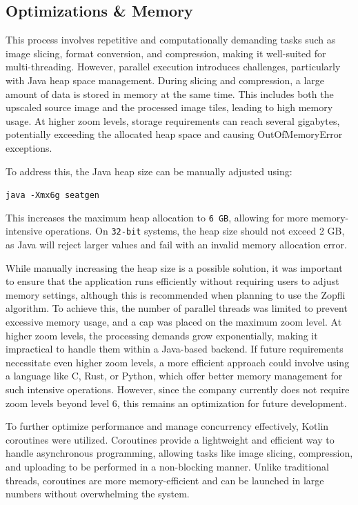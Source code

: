 \subsection{Optimizations \& Memory}

This process involves repetitive and computationally demanding tasks such as image slicing, format conversion, and compression, making it well-suited for multi-threading. However, parallel execution introduces challenges, particularly with Java heap space management. During slicing and compression, a large amount of data is stored in memory at the same time. This includes both the upscaled source image and the processed image tiles, leading to high memory usage. At higher zoom levels, storage requirements can reach several gigabytes, potentially exceeding the allocated heap space and causing OutOfMemoryError exceptions.

To address this, the Java heap size can be manually adjusted using:

\texttt{java -Xmx6g seatgen}

This increases the maximum heap allocation to \texttt{6 GB}, allowing for more memory-intensive operations. On \texttt{32-bit} systems, the heap size should not exceed 2 GB, as Java will reject larger values and fail with an invalid memory allocation error.

While manually increasing the heap size is a possible solution, it was important to ensure that the application runs efficiently without requiring users to adjust memory settings, although this is recommended when planning to use the Zopfli algorithm. To achieve this, the number of parallel threads was limited to prevent excessive memory usage, and a cap was placed on the maximum zoom level. At higher zoom levels, the processing demands grow exponentially, making it impractical to handle them within a Java-based backend. If future requirements necessitate even higher zoom levels, a more efficient approach could involve using a language like C, Rust, or Python, which offer better memory management for such intensive operations. However, since the company currently does not require zoom levels beyond level 6, this remains an optimization for future development.

To further optimize performance and manage concurrency effectively, Kotlin coroutines were utilized. Coroutines provide a lightweight and efficient way to handle asynchronous programming, allowing tasks like image slicing, compression, and uploading to be performed in a non-blocking manner. Unlike traditional threads, coroutines are more memory-efficient and can be launched in large numbers without overwhelming the system.

